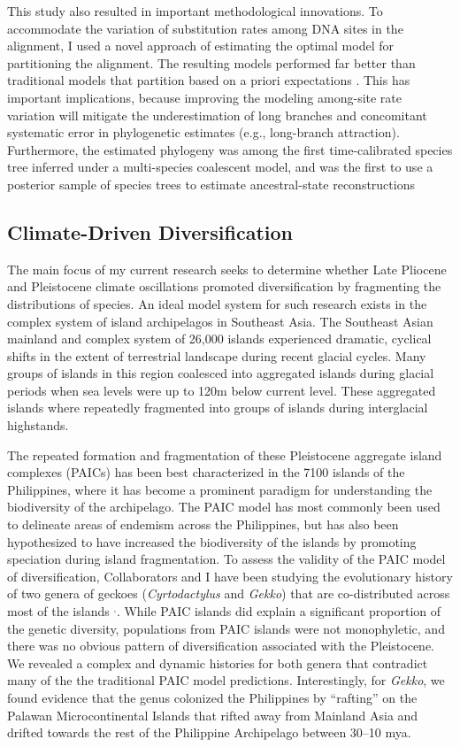 \documentclass[10pt]{article}
\newcommand{\super}[1]{\ensuremath{^{\textrm{#1}}}}
\begin{document}
This study also resulted in important methodological innovations.
To accommodate the variation of substitution rates among DNA sites in the alignment, I used a novel approach of estimating the optimal model for partitioning the alignment.
The resulting models performed far better than traditional models that partition based on a priori expectations \cite{OaksInPrep}.
This has important implications, because improving the modeling among-site rate variation will mitigate the underestimation of long branches and concomitant systematic error in phylogenetic estimates (e.g., long-branch attraction).
Furthermore, the estimated phylogeny was among the first time-calibrated species tree inferred under a multi-species coalescent model, and was the first to use a posterior sample of species trees to estimate ancestral-state reconstructions

\subsection*{Climate-Driven Diversification}
The main focus of my current research seeks to determine whether Late Pliocene and Pleistocene climate oscillations promoted diversification by fragmenting the distributions of species.
An ideal model system for such research exists in the complex system of island archipelagos in Southeast Asia.
The Southeast Asian mainland and complex system of 26,000\+ islands experienced dramatic, cyclical shifts in the extent of terrestrial landscape during recent glacial cycles.
Many groups of islands in this region coalesced into aggregated islands during glacial periods when sea levels were up to 120m below current level.
These aggregated islands where repeatedly fragmented into groups of islands during interglacial highstands.

The repeated formation and fragmentation of these Pleistocene aggregate island complexes (PAICs) has been best characterized in the 7100\+ islands of the Philippines, where it has become a prominent paradigm for understanding the biodiversity of the archipelago.
The PAIC model has most commonly been used to delineate areas of endemism across the Philippines, but has also been hypothesized to have increased the biodiversity of the islands by promoting speciation during island fragmentation.
To assess the validity of the PAIC model of diversification, Collaborators and I have been studying the evolutionary history of two genera of geckoes (\emph{Cyrtodactylus} and \emph{Gekko}) that are co-distributed across most of the islands \cite{Siler2010}\super{,}\cite{Siler2012}.
While PAIC islands did explain a significant proportion of the genetic diversity, populations from PAIC islands were not monophyletic, and there was no obvious pattern of diversification associated with the Pleistocene.
We revealed a complex and dynamic histories for both genera that contradict many of the the traditional PAIC model predictions.
Interestingly, for \emph{Gekko}, we found evidence that the genus colonized the Philippines by ``rafting'' on the Palawan Microcontinental Islands that rifted away from Mainland Asia and drifted towards the rest of the Philippine Archipelago between 30--10 mya.
\end{document}
